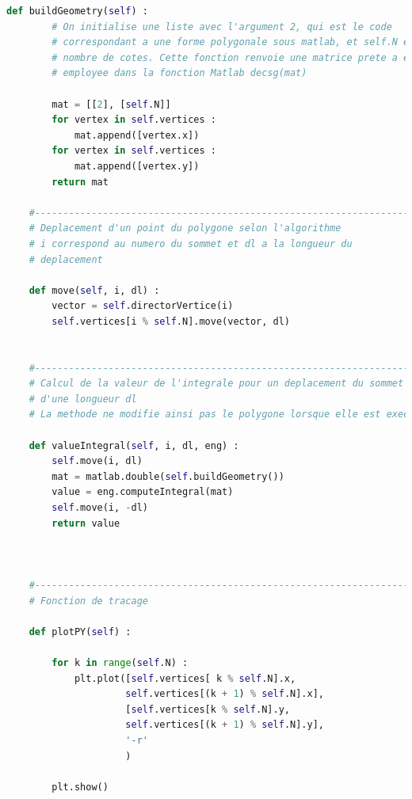 \documentclass[a4paper,reqno]{article}
\begin{document}
\begin{lstlisting}[language=Python,frame=single,caption=Création de la classe Polygon]
    def buildGeometry(self) : 
        # On initialise une liste avec l'argument 2, qui est le code  
        # correspondant a une forme polygonale sous matlab, et self.N est le 
        # nombre de cotes. Cette fonction renvoie une matrice prete a etre  
        # employee dans la fonction Matlab decsg(mat)
        
        mat = [[2], [self.N]] 
        for vertex in self.vertices : 
            mat.append([vertex.x]) 
        for vertex in self.vertices : 
            mat.append([vertex.y]) 
        return mat
        
    #---------------------------------------------------------------------    
    # Deplacement d'un point du polygone selon l'algorithme 
    # i correspond au numero du sommet et dl a la longueur du 
    # deplacement 
    
    def move(self, i, dl) : 
        vector = self.directorVertice(i) 
        self.vertices[i % self.N].move(vector, dl) 
    
        
    #----------------------------------------------------------------------   
    # Calcul de la valeur de l'integrale pour un deplacement du sommet i  
    # d'une longueur dl 
    # La methode ne modifie ainsi pas le polygone lorsque elle est executee 
    
    def valueIntegral(self, i, dl, eng) : 
        self.move(i, dl) 
        mat = matlab.double(self.buildGeometry())
        value = eng.computeIntegral(mat) 
        self.move(i, -dl) 
        return value 
        
    
    
    #----------------------------------------------------------------------   
    # Fonction de tracage 
    
    def plotPY(self) : 
        
        for k in range(self.N) : 
            plt.plot([self.vertices[ k % self.N].x,
                     self.vertices[(k + 1) % self.N].x],
                     [self.vertices[k % self.N].y,
                     self.vertices[(k + 1) % self.N].y],
                     '-r'
                     )
            
        plt.show()
\end{lstlisting}

\end{document}
